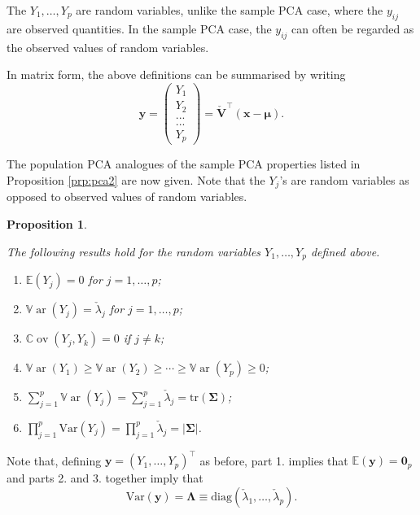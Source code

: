 \documentclass[
]{book}
\newtheorem{proposition}{Proposition}[chapter]
\theoremstyle{definition}
\theoremstyle{definition}
\theoremstyle{definition}
\theoremstyle{definition}
\theoremstyle{remark}
\begin{document}
The \(Y_1, \ldots , Y_p\) are random variables, unlike the sample PCA case, where the \(y_{ij}\) are observed quantities.
In the sample PCA case, the \(y_{ij}\) can often be regarded as the observed values of random variables.

In matrix form, the above definitions can be summarised by writing
\[
\mathbf y=\begin{pmatrix} Y_1 \\ Y_2 \\ ... \\...\\Y_p   \end{pmatrix} = \check{\mathbf V}^\top (\mathbf x-{\pmb \mu}).
\]

The population PCA analogues of the sample PCA properties listed in Proposition \ref{prp:pca2} are now given. Note that the
\(Y_j\)'s are random variables as opposed to observed values of random variables.

\begin{proposition}
\protect\hypertarget{prp:pca3}{}\label{prp:pca3}

The following results hold for the random variables \(Y_1, \ldots , Y_p\) defined above.

\begin{enumerate}
\def\labelenumi{\arabic{enumi}.}
\item
  \({\mathbb{E}}(Y_j)=0\) for \(j=1, \ldots , p\);
\item
  \({\mathbb{V}\operatorname{ar}}(Y_j)=\check{\lambda}_j\) for \(j=1,\ldots, p\);
\item
  \({\mathbb{C}\operatorname{ov}}(Y_j,Y_k)=0\) if \(j \neq k\);
\item
  \({\mathbb{V}\operatorname{ar}}(Y_1) \geq {\mathbb{V}\operatorname{ar}}(Y_2) \geq \cdots \geq {\mathbb{V}\operatorname{ar}}(Y_p) \geq 0\);
\item
  \(\sum_{j=1}^p {\mathbb{V}\operatorname{ar}}(Y_j)=\sum_{j=1}^p \check{\lambda}_j=\text{tr}(\boldsymbol{\Sigma})\);
\item
  \(\prod_{j=1}^p \text{Var}(Y_j)=\prod_{j=1}^p \check{\lambda}_j=\vert \boldsymbol{\Sigma}\vert\).
\end{enumerate}

\end{proposition}

Note that, defining \(\mathbf y=(Y_1, \ldots , Y_p)^\top\) as before, part 1. implies that \({\mathbb{E}}(\mathbf y)={\mathbf 0}_p\) and parts 2. and 3. together imply that
\[
\text{Var}(\mathbf y)=\boldsymbol \Lambda\equiv \text{diag}(\check{\lambda}_1, \ldots , \check{\lambda}_p).
\]
\end{document}
